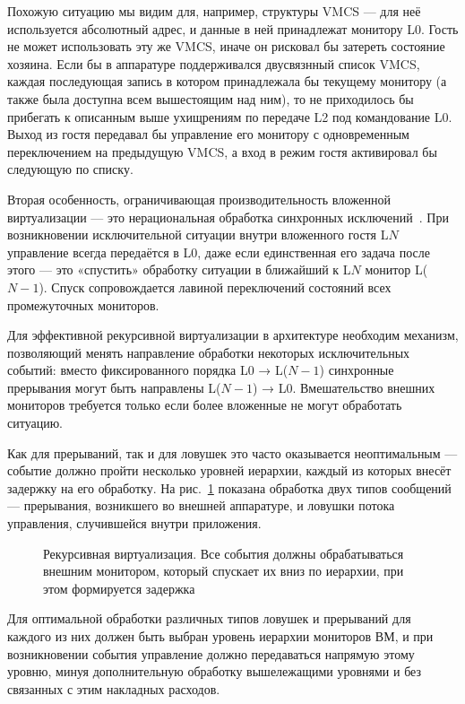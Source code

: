 Похожую ситуацию мы видим для, например, структуры VMCS — для неё используется абсолютный адрес, и данные в ней принадлежат монитору L0. Гость не может использовать эту же VMCS, иначе он рисковал бы затереть состояние хозяина. Если бы в аппаратуре поддерживался двусвязнный список VMCS, каждая последующая запись в котором принадлежала бы текущему монитору (а также была доступна всем вышестоящим над ним), то не приходилось бы прибегать к описанным выше ухищрениям по передаче L2 под командование L0. Выход из гостя передавал бы управление его монитору с одновременным переключением на предыдущую VMCS, а вход в режим гостя активировал бы следующую по списку.

Вторая особенность, ограничивающая производительность вложенной виртуализации — это нерациональная обработка синхронных исключений \cite{recursive-virt-poon}. При возникновении исключительной ситуации внутри вложенного гостя L$N$ управление всегда передаётся в L0, даже если единственная его задача после этого — это «спустить» обработку ситуации в ближайший к L$N$ монитор L($N-1$). Спуск сопровождается лавиной переключений состояний всех промежуточных мониторов.

Для эффективной рекурсивной виртуализации в архитектуре необходим механизм, позволяющий менять направление обработки некоторых исключительных событий: вместо фиксированного порядка L0 → L($N-1$) синхронные прерывания могут быть направлены L($N-1$) → L0. Вмешательство внешних мониторов требуется только если более вложенные не могут обработать ситуацию.

Как для прерываний, так и для ловушек это часто оказывается неоптимальным --- событие должно пройти несколько уровней иерархии, каждый из которых внесёт задержку на его обработку. На рис.~\ref{fig:recursive-vm} показана обработка двух типов сообщений --- прерывания, возникшего во внешней аппаратуре, и ловушки потока управления, случившейся внутри приложения.

\begin{figure}[htb]
    \centering
    \caption[Рекурсивная виртуализация]{Рекурсивная виртуализация. Все события должны обрабатываться внешним монитором, который спускает их вниз по иерархии, при этом формируется задержка}
    \label{fig:recursive-vm}
\end{figure}

Для оптимальной обработки различных типов ловушек и прерываний для каждого из них должен быть выбран уровень иерархии мониторов ВМ, и при возникновении события управление должно передаваться напрямую этому уровню, минуя дополнительную обработку вышележащими уровнями и без связанных с этим накладных расходов.


